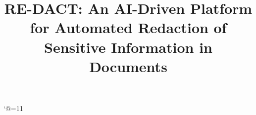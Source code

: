 \bgroup
\catcode`@=11
\gdef\getfontsize{\f@size pt}
\egroup
\newcommand{\normal}{\fontsize{12pt}{16pt}\selectfont}
\newcommand{\size}{\fontsize{14pt}{18pt}\selectfont}
\newcommand{\bigsize}{\fontsize{16pt}{20pt}\selectfont}
\newcommand{\bigbigsize}{\fontsize{20pt}{24pt}\selectfont}
\title{\bigbigsize \textbf{RE-DACT: An AI-Driven Platform for Automated Redaction of Sensitive Information in Documents}}





